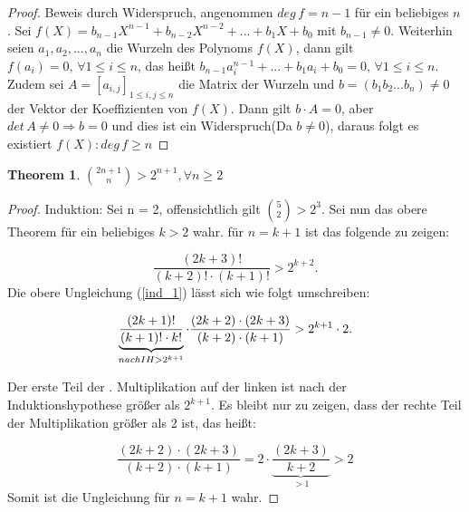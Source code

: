\documentclass[12pt,oneside]{article}
\newtheorem{theorem}{Theorem}[section]
\theoremstyle{remark}
\theoremstyle{definition}
\begin{document}
\begin{proof}
Beweis durch Widerspruch, angenommen $deg \, f = n - 1$ für ein beliebiges $n$. Sei $f(X) = b_{n-1}X^{n-1} + b_{n-2}X^{n-2} + ... + b_1 X + b_0$ mit $b_{n-1} \neq 0$. Weiterhin seien $a_1,a_2,...,a_{n}$ die Wurzeln des Polynoms $f(X)$, dann gilt $f(a_i) = 0, \, \forall 1 \leq i \leq n$, das heißt $b_{n-1} a_i^{n-1} +...+ b_1 a_i + b_0 = 0, \, \forall 1 \leq i \leq n$. \newline\newline Zudem sei $A = [a_{i,j}]_{1 \leq i,j \leq n}$ die Matrix der Wurzeln und $b = (b_1 b_2 ...b_{n}) \neq 0$ der Vektor der Koeffizienten von $f(X)$. Dann gilt $b \cdot A = 0$, aber $det \, A \neq 0 \Rightarrow  b = 0$ und dies ist ein Widerspruch(Da $b \neq 0$), daraus folgt es existiert $f(X) : deg \, f \geq n$  
\end{proof}

\smallskip

\begin{flushleft}
\begin{theorem}\label{useful_theorem_for_proof}
${2n + 1 \choose n} > 2^{n+1}, \forall n \geq 2$
\end{theorem}

\begin{proof}
Induktion: Sei n = 2, offensichtlich gilt ${5 \choose 2} > 2^3$. Sei nun das obere Theorem für ein beliebiges $k > 2 $ wahr.\newline\newline
für $n = k + 1$ ist das folgende zu zeigen: 

\begin{equation}\label{ind_1}
    \frac{(2k + 3)!}{(k + 2)!\cdot(k + 1)!} > 2^{k+2}.
\end{equation}
\newline\newline
Die obere Ungleichung (\ref{ind_1}) lässt sich wie folgt umschreiben:\newline\newline


\begin{equation}
     \underbrace{\frac{(2k + 1)!}{(k + 1)! \cdot k!}}_{nach IH > 2^{k + 1}} \cdot \frac{(2k + 2) \cdot (2k + 3)}{(k + 2) \cdot (k + 1)} > 2^{k+1} \cdot 2.\newline\newline
\end{equation}

Der erste Teil der . Multiplikation auf der linken ist nach der Induktionshypothese größer als $2^{k+1}$. Es bleibt nur zu zeigen, dass der rechte Teil der Multiplikation größer als 2 ist, das heißt: \newline\newline

\begin{equation}\label{ind_eq}
\frac{(2k + 2) \cdot (2k + 3)}{(k + 2) \cdot (k + 1)} = 2 \cdot \underbrace{\frac{(2k + 3 )}{k + 2}}_{ > 1} > 2
\end{equation}
Somit ist die Ungleichung für $n = k + 1$ wahr.
\end{proof}

\end{flushleft}
\end{document}
